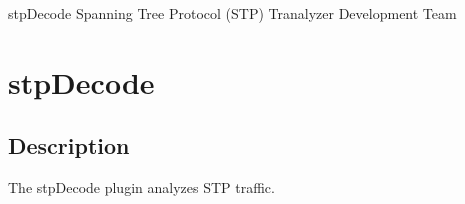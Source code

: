 \documentclass[documentation]{subfiles}
\begin{document}
\trantitle
    {stpDecode} %
    {Spanning Tree Protocol (STP)} %
    {Tranalyzer Development Team} %

\section{stpDecode}\label{s:stpDecode}

\subsection{Description}
The stpDecode plugin analyzes STP traffic.




%
%

\end{document}
